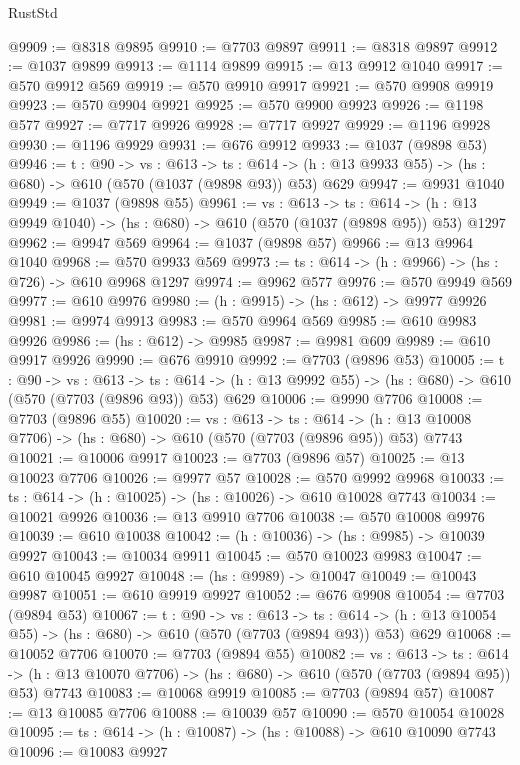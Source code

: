\begin{lexlean}{RustStd}
\begin{coremodule}
@9909 := @8318 @9895
@9910 := @7703 @9897
@9911 := @8318 @9897
@9912 := @1037 @9899
@9913 := @1114 @9899
@9915 := @13 @9912 @1040
@9917 := @570 @9912 @569
@9919 := @570 @9910 @9917
@9921 := @570 @9908 @9919
@9923 := @570 @9904 @9921
@9925 := @570 @9900 @9923
@9926 := @1198 @577
@9927 := @7717 @9926
@9928 := @7717 @9927
@9929 := @1196 @9928
@9930 := @1196 @9929
@9931 := @676 @9912
@9933 := @1037 (@9898 @53)
@9946 := {t : @90} ->
  {vs : @613} ->
  {ts : @614} -> (h : @13 @9933 @55) -> (hs : @680) -> @610 (@570 (@1037 (@9898 @93)) @53) @629
@9947 := @9931 @1040
@9949 := @1037 (@9898 @55)
@9961 := {vs : @613} ->
  {ts : @614} -> (h : @13 @9949 @1040) -> (hs : @680) -> @610 (@570 (@1037 (@9898 @95)) @53) @1297
@9962 := @9947 @569
@9964 := @1037 (@9898 @57)
@9966 := @13 @9964 @1040
@9968 := @570 @9933 @569
@9973 := {ts : @614} -> (h : @9966) -> (hs : @726) -> @610 @9968 @1297
@9974 := @9962 @577
@9976 := @570 @9949 @569
@9977 := @610 @9976
@9980 := (h : @9915) -> (hs : @612) -> @9977 @9926
@9981 := @9974 @9913
@9983 := @570 @9964 @569
@9985 := @610 @9983 @9926
@9986 := (hs : @612) -> @9985
@9987 := @9981 @609
@9989 := @610 @9917 @9926
@9990 := @676 @9910
@9992 := @7703 (@9896 @53)
@10005 := {t : @90} ->
  {vs : @613} ->
  {ts : @614} -> (h : @13 @9992 @55) -> (hs : @680) -> @610 (@570 (@7703 (@9896 @93)) @53) @629
@10006 := @9990 @7706
@10008 := @7703 (@9896 @55)
@10020 := {vs : @613} ->
  {ts : @614} -> (h : @13 @10008 @7706) -> (hs : @680) -> @610 (@570 (@7703 (@9896 @95)) @53) @7743
@10021 := @10006 @9917
@10023 := @7703 (@9896 @57)
@10025 := @13 @10023 @7706
@10026 := @9977 @57
@10028 := @570 @9992 @9968
@10033 := {ts : @614} -> (h : @10025) -> (hs : @10026) -> @610 @10028 @7743
@10034 := @10021 @9926
@10036 := @13 @9910 @7706
@10038 := @570 @10008 @9976
@10039 := @610 @10038
@10042 := (h : @10036) -> (hs : @9985) -> @10039 @9927
@10043 := @10034 @9911
@10045 := @570 @10023 @9983
@10047 := @610 @10045 @9927
@10048 := (hs : @9989) -> @10047
@10049 := @10043 @9987
@10051 := @610 @9919 @9927
@10052 := @676 @9908
@10054 := @7703 (@9894 @53)
@10067 := {t : @90} ->
  {vs : @613} ->
  {ts : @614} -> (h : @13 @10054 @55) -> (hs : @680) -> @610 (@570 (@7703 (@9894 @93)) @53) @629
@10068 := @10052 @7706
@10070 := @7703 (@9894 @55)
@10082 := {vs : @613} ->
  {ts : @614} -> (h : @13 @10070 @7706) -> (hs : @680) -> @610 (@570 (@7703 (@9894 @95)) @53) @7743
@10083 := @10068 @9919
@10085 := @7703 (@9894 @57)
@10087 := @13 @10085 @7706
@10088 := @10039 @57
@10090 := @570 @10054 @10028
@10095 := {ts : @614} -> (h : @10087) -> (hs : @10088) -> @610 @10090 @7743
@10096 := @10083 @9927

\end{coremodule}
\end{lexlean}
